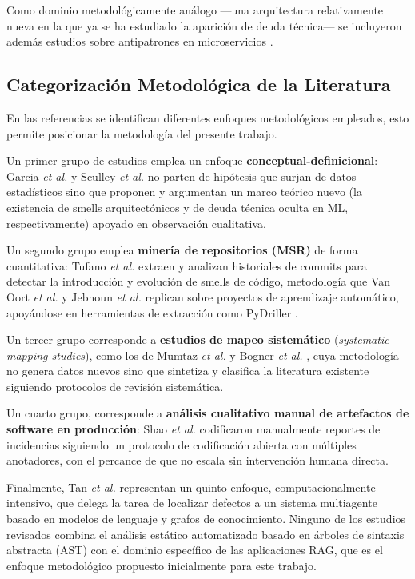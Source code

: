 Como dominio metodológicamente análogo —una arquitectura relativamente nueva en la que ya se ha estudiado la aparición de deuda técnica— se incluyeron además estudios sobre antipatrones en microservicios \cite{de_toledo_identifying_2021,verdecchia_architectural_2018,pigazzini_towards_2020}.

\subsection{Categorización Metodológica de la Literatura}
En las referencias se identifican diferentes enfoques metodológicos empleados, esto permite posicionar la metodología del presente trabajo. 

Un primer grupo de estudios emplea un enfoque \textbf{conceptual-definicional}: Garcia \textit{et al.} \cite{garcia_identifying_2009} y Sculley \textit{et al.} \cite{sculley_hidden_2015} no parten  de hipótesis que surjan de datos estadísticos sino que proponen y argumentan un marco teórico nuevo (la existencia de smells arquitectónicos y de deuda técnica oculta en ML, respectivamente) apoyado en observación cualitativa. 

Un segundo grupo emplea \textbf{minería de repositorios (MSR)} de forma cuantitativa: Tufano \textit{et al.} \cite{tufano_when_2015} extraen y analizan historiales de commits para detectar la introducción y evolución de smells de código, metodología que Van Oort \textit{et al.} \cite{oort_prevalence_2021} y Jebnoun \textit{et al.} \cite{jebnoun_scent_2020} replican sobre proyectos de aprendizaje automático, apoyándose en herramientas de extracción como PyDriller \cite{spadini_pydriller_2018}. 

Un tercer grupo corresponde a \textbf{estudios de mapeo sistemático} (\textit{systematic mapping studies}), como los de Mumtaz \textit{et al.} \cite{mumtaz_systematic_2021} y Bogner \textit{et al.} \cite{bogner_characterizing_2021}, cuya metodología no genera datos nuevos sino que sintetiza y clasifica la literatura existente siguiendo protocolos de revisión sistemática. 

Un cuarto grupo, corresponde a \textbf{análisis cualitativo manual de artefactos de software en producción}: Shao \textit{et al.} \cite{shao_are_2024} codificaron manualmente reportes de incidencias siguiendo un protocolo de codificación abierta con múltiples anotadores, con el percance de que no escala sin intervención humana directa. 

Finalmente, Tan \textit{et al.} \cite{tan_lidl_2026} representan un quinto enfoque, computacionalmente intensivo, que delega la tarea de localizar defectos a un sistema multiagente basado en modelos de lenguaje y grafos de conocimiento. Ninguno de los estudios revisados combina el análisis estático automatizado basado en árboles de sintaxis abstracta (AST) con el dominio específico de las aplicaciones RAG, que es el enfoque metodológico propuesto inicialmente para este trabajo.

